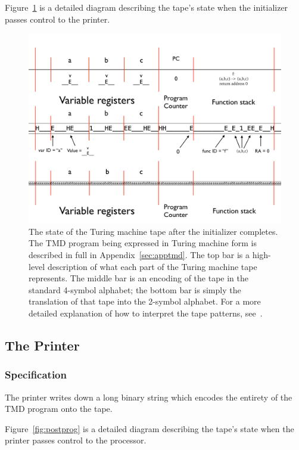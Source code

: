 \documentclass[11pt]{article}
\begin{document}
Figure~\ref{fig:postinit} is a detailed diagram describing the tape's state when the initializer passes control to the printer. 

\begin{figure} 
\begin{center} 
\includegraphics[scale=0.42]{figs/postinit.png}
\caption{The state of the Turing machine tape after the initializer completes. The TMD program being expressed in Turing machine form is described in full in Appendix~\ref{sec:apptmd}. The top bar is a high-level description of what each part of the Turing machine tape represents. The middle bar is an encoding of the tape in the standard 4-symbol alphabet; the bottom bar is simply the translation of that tape into the 2-symbol alphabet. For a more detailed explanation of how to interpret the tape patterns, see~\cite{github}. \label{fig:postinit}} 
\end{center} 
\end{figure}

\subsection{The Printer} \label{sec:introspect}

\subsubsection{Specification}

The printer writes down a long binary string which encodes the entirety of the TMD program onto the tape.

Figure~\ref{fig:postprog} is a detailed diagram describing the tape's state when the printer passes control to the processor.
\end{document}
